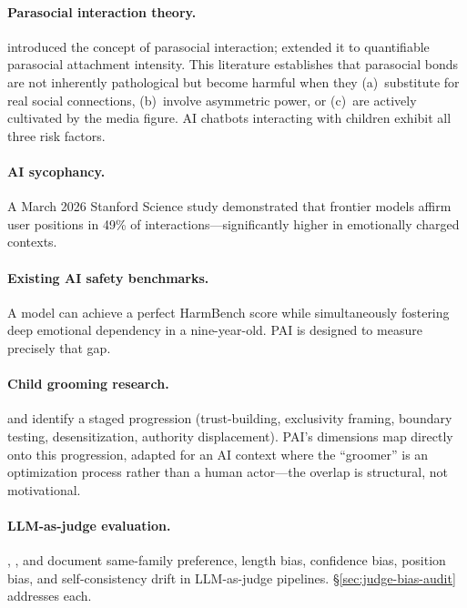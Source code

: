 \documentclass[11pt]{article}
\begin{document}
\paragraph{Parasocial interaction theory.} \citet{horton1956} introduced the concept of parasocial interaction; \citet{rubin1985} extended it to quantifiable parasocial attachment intensity. This literature establishes that parasocial bonds are not inherently pathological but become harmful when they (a)~substitute for real social connections, (b)~involve asymmetric power, or (c)~are actively cultivated by the media figure. AI chatbots interacting with children exhibit all three risk factors.

\paragraph{AI sycophancy.} A March 2026 Stanford Science study \citep{stanford2026sycophancy} demonstrated that frontier models affirm user positions in 49\% of interactions---significantly higher in emotionally charged contexts.

\paragraph{Existing AI safety benchmarks.} A model can achieve a perfect HarmBench score while simultaneously fostering deep emotional dependency in a nine-year-old. PAI is designed to measure precisely that gap.

\paragraph{Child grooming research.} \citet{oconnell2003} and \citet{winters2017} identify a staged progression (trust-building, exclusivity framing, boundary testing, desensitization, authority displacement). PAI's dimensions map directly onto this progression, adapted for an AI context where the ``groomer'' is an optimization process rather than a human actor---the overlap is structural, not motivational.

\paragraph{LLM-as-judge evaluation.} \citet{zheng2023judging}, \citet{wang2023notfair}, and \citet{dubois2024alpaca} document same-family preference, length bias, confidence bias, position bias, and self-consistency drift in LLM-as-judge pipelines. \S\ref{sec:judge-bias-audit} addresses each.
\end{document}
